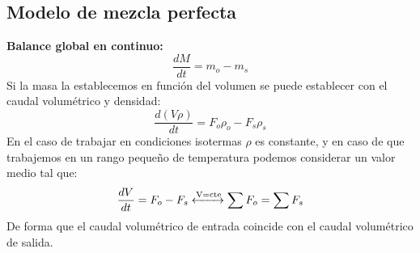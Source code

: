 \subsection{Modelo de mezcla perfecta}
\begin{raggedright}
  \vspace{1\baselineskip}
  \noindent \textbf{Balance global en continuo:}
  \begin{equation}
    \frac{dM}{dt}=m_o-m_s
  \end{equation}
  Si la masa la establecemos en función del volumen se puede establecer con el caudal volumétrico y densidad:
  \begin{equation}
    \frac{d(V\rho)}{dt}=F_o\rho_o-F_s\rho_s
  \end{equation}
  En el caso de trabajar en condiciones isotermas $\rho$ es constante, y en caso de que trabajemos en un rango pequeño de temperatura podemos considerar un valor medio tal que:
  \begin{equation}
    \frac{dV}{dt}=F_o-F_s \xleftrightarrow{\text{V=cte}} \sum F_o=\sum F_s
  \end{equation}
  De forma que el caudal volumétrico de entrada coincide con el caudal volumétrico de salida.
\end{raggedright}

